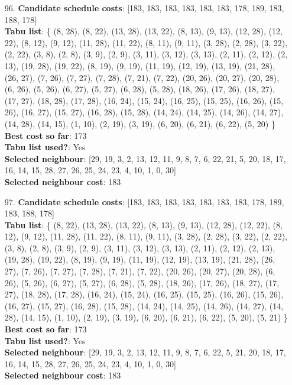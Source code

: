 \documentclass[fleqn]{article}
\begin{document}
\begin{itemize}
    \item[96.] \textbf{Candidate schedule costs}: [183, 183, 183, 183, 183, 183, 178, 189, 183, 188, 178] \\
    \textbf{Tabu list}: \{ (8, 28), (8, 22), (13, 28), (13, 22), (8, 13), (9, 13), (12, 28), (12, 22), (8, 12), (9, 12), (11, 28), (11, 22), (8, 11), (9, 11), (3, 28), (2, 28), (3, 22), (2, 22), (3, 8), (2, 8), (3, 9), (2, 9), (3, 11), (3, 12), (3, 13), (2, 11), (2, 12), (2, 13), (19, 28), (19, 22), (8, 19), (9, 19), (11, 19), (12, 19), (13, 19), (21, 28), (26, 27), (7, 26), (7, 27), (7, 28), (7, 21), (7, 22), (20, 26), (20, 27), (20, 28), (6, 26), (5, 26), (6, 27), (5, 27), (6, 28), (5, 28), (18, 26), (17, 26), (18, 27), (17, 27), (18, 28), (17, 28), (16, 24), (15, 24), (16, 25), (15, 25), (16, 26), (15, 26), (16, 27), (15, 27), (16, 28), (15, 28), (14, 24), (14, 25), (14, 26), (14, 27), (14, 28), (14, 15), (1, 10), (2, 19), (3, 19), (6, 20), (6, 21), (6, 22), (5, 20) \} \\
    \textbf{Best cost so far}: 173 \\
    \textbf{Tabu list used?}: Yes \\
    \textbf{Selected neighbour}: [29, 19, 3, 2, 13, 12, 11, 9, 8, 7, 6, 22, 21, 5, 20, 18, 17, 16, 14, 15, 28, 27, 26, 25, 24, 23, 4, 10, 1, 0, 30] \\
    \textbf{Selected neighbour cost}: 183
      

    \item[97.] \textbf{Candidate schedule costs}: [183, 183, 183, 183, 183, 183, 183, 178, 189, 183, 188, 178] \\
    \textbf{Tabu list}: \{ (8, 22), (13, 28), (13, 22), (8, 13), (9, 13), (12, 28), (12, 22), (8, 12), (9, 12), (11, 28), (11, 22), (8, 11), (9, 11), (3, 28), (2, 28), (3, 22), (2, 22), (3, 8), (2, 8), (3, 9), (2, 9), (3, 11), (3, 12), (3, 13), (2, 11), (2, 12), (2, 13), (19, 28), (19, 22), (8, 19), (9, 19), (11, 19), (12, 19), (13, 19), (21, 28), (26, 27), (7, 26), (7, 27), (7, 28), (7, 21), (7, 22), (20, 26), (20, 27), (20, 28), (6, 26), (5, 26), (6, 27), (5, 27), (6, 28), (5, 28), (18, 26), (17, 26), (18, 27), (17, 27), (18, 28), (17, 28), (16, 24), (15, 24), (16, 25), (15, 25), (16, 26), (15, 26), (16, 27), (15, 27), (16, 28), (15, 28), (14, 24), (14, 25), (14, 26), (14, 27), (14, 28), (14, 15), (1, 10), (2, 19), (3, 19), (6, 20), (6, 21), (6, 22), (5, 20), (5, 21) \} \\
    \textbf{Best cost so far}: 173 \\
    \textbf{Tabu list used?}: Yes \\
    \textbf{Selected neighbour}: [29, 19, 3, 2, 13, 12, 11, 9, 8, 7, 6, 22, 5, 21, 20, 18, 17, 16, 14, 15, 28, 27, 26, 25, 24, 23, 4, 10, 1, 0, 30] \\
    \textbf{Selected neighbour cost}: 183
      


\end{itemize}
\end{document}
